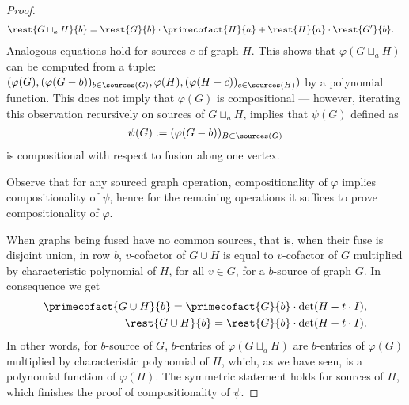 \begin{proof}
\begin{align*}
&\rest{G\sqcup_a H}{b} = \rest{G}{b} \cdot \primecofact{H}{a} + \rest{H}{a} \cdot \rest{G'}{b}.
\end{align*}
Analogous equations hold for sources $c$ of graph $H$. 
This shows that
$
\varphi(G \sqcup_a H)$ can be computed from a tuple: $(\varphi(G), (\varphi(G-b))_{b\in\sources(G)}, \varphi(H), (\varphi(H-c))_{c\in \sources(H)})
$
by a polynomial function.
This does not imply that $\varphi(G)$ is compositional --- however, iterating this observation recursively on sources of $G\sqcup_a H$, implies that $\psi(G)$ defined as
$$\psi(G) := (\varphi(G-b))_{B\subset\sources(G)}$$ is compositional with respect to fusion along one vertex.

Observe that for any sourced graph operation, compositionality of $\varphi$ implies compositionality of $\psi$, hence for the remaining operations it suffices to prove compositionality of $\varphi$.

When graphs being fused have no common sources, that is, when their fuse is disjoint union, in row $b$, $v$-cofactor of $G \cup H$ is equal to $v$-cofactor of $G$ multiplied by characteristic polynomial of $H$, for all $v \in G$, for a $b$-source of graph $G$. In consequence we get
\begin{align*}
\primecofact{G\cup H}{b} = \primecofact{G}{b} \cdot \det(H - t\cdot I), \\
\rest{G\cup H}{b} = \rest{G}{b} \cdot \det(H - t\cdot I).
\end{align*}
In other words, for $b$-source of $G$, $b$-entries of $\varphi(G \sqcup_a H)$ are $b$-entries of $\varphi(G)$ multiplied by characteristic polynomial of $H$, which, as we have seen, is a polynomial function of $\varphi(H)$. The symmetric statement holds for sources of $H$, which finishes the proof of compositionality of $\psi$.
\end{proof}
%
